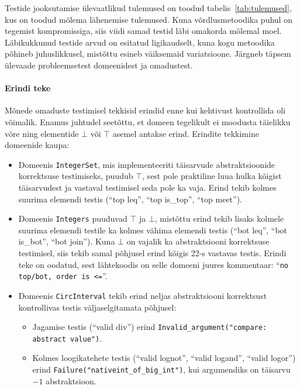 \documentclass[../thesis.tex]{subfiles}
\begin{document}
Testide jooksutamise ülevaatlikud tulemused on toodud tabelis~\ref{tab:tulemused}, kus on toodud mõlema lähenemise tulemused. Kuna võrdlusmetoodika puhul on tegemist kompromissiga, siis viidi samad testid läbi omakorda mõlemal moel. Läbikukkunud testide arvud on esitatud ligikaudselt, kuna kogu metoodika põhineb juhuslikkusel, mistõttu esineb väiksemaid variatsioone. Järgneb täpsem ülevaade probleemsetest domeenidest ja omadustest.

\paragraph{Erindi teke}
Mõnede omaduste testimisel tekkisid erindid enne kui kehtivust kontrollida oli võimalik. Enamus juhtudel seetõttu, et domeen tegelikult ei moodusta täielikku võre ning elementide $\bot$ või $\top$ asemel antakse erind. Erindite tekkimine domeenide kaupa:
\begin{itemize}
	\item Domeenis \texttt{IntegerSet}, mis implementeeriti täisarvude abstraktsioonide korrektsuse testimiseks, puudub $\top$, sest pole praktiline luua hulka kõigist täisarvudest ja vastaval testimisel seda pole ka vaja. Erind tekib kolmes suurima elemendi testis (\enquote{top leq}, \enquote{top is\_top}, \enquote{top meet}).

	\item Domeenis \texttt{Integers} puuduvad $\top$ ja $\bot$, mistõttu erind tekib lisaks kolmele suurima elemendi testile ka kolmes vähima elemendi testis (\enquote{bot leq}, \enquote{bot is\_bot}, \enquote{bot join}). Kuna $\bot$ on vajalik ka abstraktsiooni korrektsuse testimisel, siis tekib samal põhjusel erind kõigis 22-s vastavas testis. Erindi teke on oodatud, sest lähtekoodis on selle domeeni juures kommentaar: \enquote{\texttt{no top/bot, order is <=}}.

	\item Domeenis \texttt{CircInterval} tekib erind neljas abstraktsiooni korrektsust kontrollivas testis väljaselgitamata põhjusel:
	\begin{itemize}[nosep]
		\item Jagamise testis (\enquote{valid div}) erind \texttt{Invalid\_argument("compare: abstract value")}.

		\item Kolmes loogikatehete testis (\enquote{valid lognot}, \enquote{valid logand}, \enquote{valid logor}) erind \texttt{Failure("nativeint\_of\_big\_int")}, kui argumendiks on täisarvu $-1$ abstraktsioon.
	\end{itemize}
\end{itemize}
\end{document}
